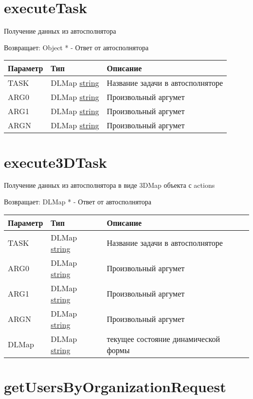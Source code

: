 \hypertarget{executetasktask-arg0-arg1-argn-object}{%
\section{executeTask}\label{executetasktask-arg0-arg1-argn-object}}

Получение данных из автосполнятора

Возвращает: Object \textbar{} * - Ответ от автосполнятора

\begin{longtable}[]{@{}lll@{}}
\toprule
Параметр & Тип & Описание\tabularnewline
\midrule
\endhead
TASK & DLMap \textbar{} \protect\hyperlink{string}{string} & Название
задачи в автосполняторе\tabularnewline
ARG0 & DLMap \textbar{} \protect\hyperlink{string}{string} &
Произвольный аргумет\tabularnewline
ARG1 & DLMap \textbar{} \protect\hyperlink{string}{string} &
Произвольный аргумет\tabularnewline
ARGN & DLMap \textbar{} \protect\hyperlink{string}{string} &
Произвольный аргумет\tabularnewline
\bottomrule
\end{longtable}

\section{execute3DTask
\label{execute3dtasktask-arg0-arg1-argn-dlmap-object}}
Получение данных из автосполнятора в виде 3DMap объекта с actions

Возвращает: DLMap \textbar{} * - Ответ от автосполнятора

\begin{longtable}[]{@{}lll@{}}
\toprule
Параметр & Тип & Описание\tabularnewline
\midrule
\endhead
TASK & DLMap \textbar{} \protect\hyperlink{string}{string} & Название
задачи в автосполняторе\tabularnewline
ARG0 & DLMap \textbar{} \protect\hyperlink{string}{string} &
Произвольный аргумет\tabularnewline
ARG1 & DLMap \textbar{} \protect\hyperlink{string}{string} &
Произвольный аргумет\tabularnewline
ARGN & DLMap \textbar{} \protect\hyperlink{string}{string} &
Произвольный аргумет\tabularnewline
DLMap & DLMap \textbar{} \protect\hyperlink{string}{string} &
текущее состояние динамической формы\tabularnewline
\bottomrule
\end{longtable}

\hypertarget{getusersbyorganizationrequestrealtyobj-text-object}{%
\section{getUsersByOrganizationRequest}\label{getusersbyorganizationrequestrealtyobj-text-object}}

